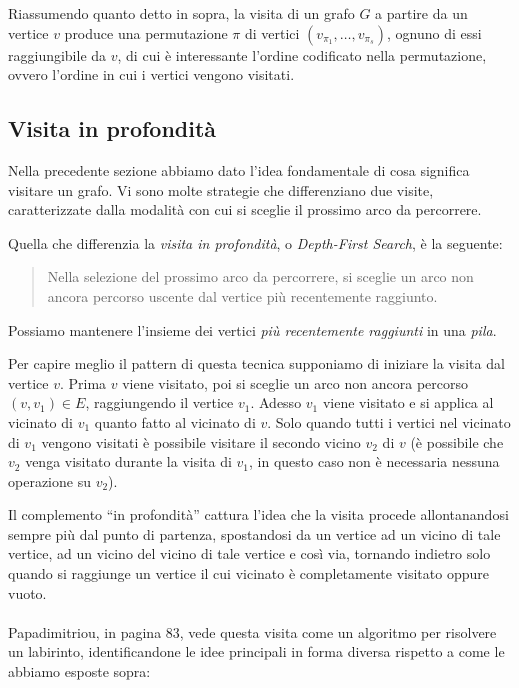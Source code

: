 Riassumendo quanto detto in sopra, la visita di un grafo $G$ a partire
da un vertice $v$ produce una permutazione $\pi$ di vertici
$(v_{\pi_{1}}, \ldots, v_{\pi_{s}})$, ognuno di essi raggiungibile da
$v$, di cui \`e interessante l'ordine codificato nella permutazione,
ovvero l'ordine in cui i vertici vengono visitati.

\subsection{Visita in profondit\`a}
Nella precedente sezione abbiamo dato l'idea fondamentale di cosa
significa visitare un grafo. Vi sono molte strategie che differenziano
due visite, caratterizzate dalla modalit\`a con cui si sceglie il
prossimo arco da percorrere.

Quella che differenzia la \emph{visita in profondit\`a}, o
\emph{Depth-First Search}, \`e la seguente:
\begin{quotation}
  Nella selezione del prossimo arco da percorrere, si sceglie un arco
  non ancora percorso uscente dal vertice pi\`u recentemente
  raggiunto.
\end{quotation}
Possiamo mantenere l'insieme dei vertici \emph{pi\`u recentemente
  raggiunti} in una \emph{pila}.

Per capire meglio il pattern di questa tecnica supponiamo di iniziare
la visita dal vertice $v$. Prima $v$ viene visitato, poi si sceglie un
arco non ancora percorso $(v, v_{1}) \in E$, raggiungendo il vertice
$v_{1}$. Adesso $v_{1}$ viene visitato e si applica al vicinato di
$v_{1}$ quanto fatto al vicinato di $v$. Solo quando tutti i vertici
nel vicinato di $v_{1}$ vengono visitati \`e possibile visitare il
secondo vicino $v_{2}$ di $v$ (\`e possibile che $v_{2}$ venga
visitato durante la visita di $v_{1}$, in questo caso non \`e
necessaria nessuna operazione su $v_{2}$).

Il complemento ``in profondit\`a'' cattura l'idea che la visita
procede allontanandosi sempre pi\`u dal punto di partenza, spostandosi
da un vertice ad un vicino di tale vertice, ad un vicino del vicino di
tale vertice e cos\`i via, tornando indietro solo quando si raggiunge
un vertice il cui vicinato \`e completamente visitato oppure vuoto.
\\\\
Papadimitriou, in \cite{Algorithms} pagina 83, vede questa visita come
un algoritmo per risolvere un labirinto, identificandone le idee
principali in forma diversa rispetto a come le abbiamo esposte sopra:

